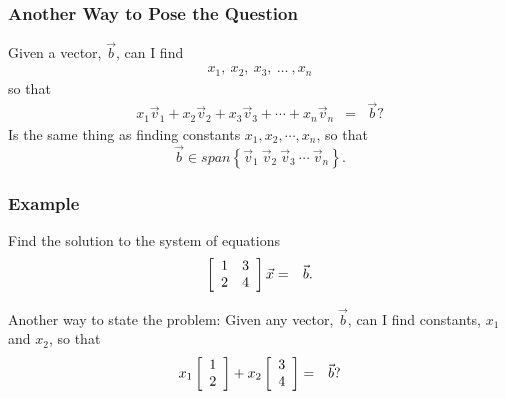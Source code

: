 \begin{frame}
  \frametitle{Another Way to Pose the Question}

  Given a vector, $\vec{b}$, can I find 
  \begin{eqnarray*}
    x_1,~x_2,~x_3,~\ldots~,x_n
  \end{eqnarray*}
  so that 
  \begin{eqnarray*}
    x_1 \vec{v}_1 + x_2 \vec{v}_2 + x_3 \vec{v}_3 + \cdots + x_n \vec{v}_n & = & \vec{b}?
  \end{eqnarray*}
  Is the same thing as finding constants $x_1, x_2, \cdots, x_n$, so that 
   $$\vec{b} \in  span
   \left\{\vec{v}_1 ~ \vec{v}_2 ~ \vec{v}_3 ~ \cdots ~ \vec{v}_n \right\}.
   $$

\end{frame}


%
%
%
%
%  
%


\begin{frame}
  \frametitle{Example}

  Find the solution to the system of equations
  \begin{eqnarray*}
    \left[ \begin{array}{rr} 1 & 3 \\ 2 & 4 \end{array} \right] \vec{x} & = & \vec{b}.
  \end{eqnarray*}

   { Another way to state the problem: Given any vector,
    $\vec{b}$, can I find constants, $x_1$ and $x_2$, so that 
    \begin{eqnarray*}
      x_1 \left[ \begin{array}{r} 1 \\ 2 \end{array} \right] + x_2 \left[ \begin{array}{r} 3 \\ 4 \end{array} \right]  & = & \vec{b}?
    \end{eqnarray*}
  }

  
\end{frame}


